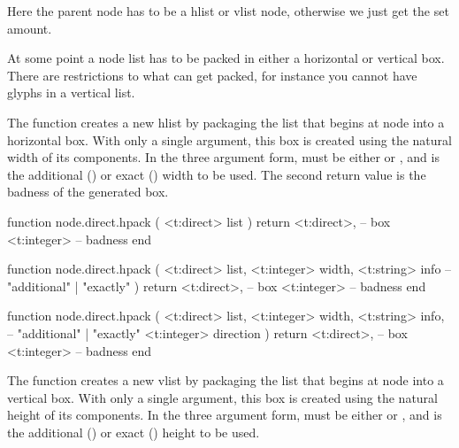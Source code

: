 Here the parent node has to be a hlist or vlist node, otherwise we just get the
set amount.

\stopsubsection

\startsubsection[title=Packaging and dimensions]

At some point a node list has to be packed in either a horizontal or vertical
box. There are restrictions to what can get packed, for instance you cannot have
glyphs in a vertical list.


The  function creates a new hlist by packaging the list that begins
at node  into a horizontal box. With only a single argument, this box is
created using the natural width of its components. In the three argument form,
 must be either  or , and 
is the additional () or exact () width to be
used. The second return value is the badness of the generated box.

\starttyping[option=LUA]
function node.direct.hpack (
    <t:direct> list
)
    return
        <t:direct>, -- box
        <t:integer> -- badness
end

function node.direct.hpack (
    <t:direct>  list,
    <t:integer> width,
    <t:string>  info -- "additional" | "exactly"
)
    return
        <t:direct>, -- box
        <t:integer> -- badness
end

function node.direct.hpack (
    <t:direct>  list,
    <t:integer> width,
    <t:string>  info, -- "additional" | "exactly"
    <t:integer> direction
)
    return
        <t:direct>, -- box
        <t:integer> -- badness
end
\stoptyping


The  function creates a new vlist by packaging the list that begins
at node  into a vertical box. With only a single argument, this box is
created using the natural height of its components. In the three argument form,
 must be either  or , and 
is the additional () or exact () height to be
used.

